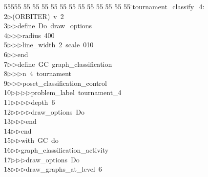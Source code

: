 %
%
\begin{tabbing}
55555 \= 55 \= 55 \= 55 \= 55 \= 55 \= 55 \= 55 \= 55 \= 55 \= 55 \= 55 \= 55 \= \>tournament\_classify\_4:\\[0pt]
2\>$\triangleright$\>(ORBITER)\ v\ 2\ \\[0pt]
3\>$\triangleright$\>$\triangleright$\>define\ Do\ draw\_options\ \\[0pt]
4\>$\triangleright$\>$\triangleright$\>$\triangleright$\>radius\ 400\ \\[0pt]
5\>$\triangleright$\>$\triangleright$\>$\triangleright$\>line\_width\ 2\ scale\ 010\ \\[0pt]
6\>$\triangleright$\>$\triangleright$\>end\ \\[0pt]
7\>$\triangleright$\>$\triangleright$\>define\ GC\ graph\_classification\ \\[0pt]
8\>$\triangleright$\>$\triangleright$\>$\triangleright$\>n\ 4\ tournament\ \\[0pt]
9\>$\triangleright$\>$\triangleright$\>$\triangleright$\>poset\_classification\_control\ \\[0pt]
10\>$\triangleright$\>$\triangleright$\>$\triangleright$\>$\triangleright$\>problem\_label\ tournament\_4\ \\[0pt]
11\>$\triangleright$\>$\triangleright$\>$\triangleright$\>$\triangleright$\>depth\ 6\ \\[0pt]
12\>$\triangleright$\>$\triangleright$\>$\triangleright$\>$\triangleright$\>draw\_options\ Do\ \\[0pt]
13\>$\triangleright$\>$\triangleright$\>$\triangleright$\>end\ \\[0pt]
14\>$\triangleright$\>$\triangleright$\>end\ \\[0pt]
15\>$\triangleright$\>$\triangleright$\>with\ GC\ do\ \\[0pt]
16\>$\triangleright$\>$\triangleright$\>graph\_classification\_activity\ \\[0pt]
17\>$\triangleright$\>$\triangleright$\>$\triangleright$\>draw\_options\ Do\ \\[0pt]
18\>$\triangleright$\>$\triangleright$\>$\triangleright$\>draw\_graphs\_at\_level\ 6\ \\[0pt]

\end{tabbing}
